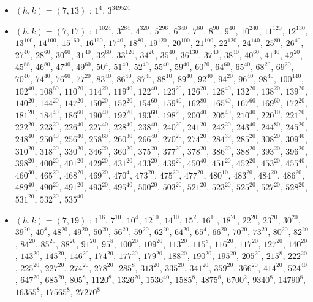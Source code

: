 \begin{itemize}
\item $(h,k)=(7,13)$ : $1^{4}$, $3^{349524}$
\item $(h,k)=(7,17)$ : $1^{1024}$, $3^{284}$, $4^{320}$, $5^{296}$, $6^{340}$, $7^{80}$, $8^{90}$, $9^{40}$, $10^{240}$, $11^{120}$, $12^{130}$, $13^{100}$, $14^{100}$, $15^{160}$, $16^{160}$, $17^{40}$, $18^{80}$, $19^{120}$, $20^{100}$, $21^{100}$, $22^{120}$, $24^{140}$, $25^{80}$, $26^{40}$, $27^{40}$, $28^{60}$, $30^{60}$, $31^{40}$, $32^{60}$, $33^{120}$, $34^{20}$, $35^{40}$, $36^{130}$, $37^{40}$, $38^{40}$, $40^{60}$, $41^{40}$, $42^{20}$, $45^{88}$, $46^{80}$, $47^{40}$, $49^{60}$, $50^{4}$, $51^{40}$, $52^{40}$, $55^{40}$, $59^{40}$, $60^{20}$, $64^{60}$, $65^{40}$, $68^{20}$, $69^{20}$, $70^{40}$, $74^{40}$, $76^{60}$, $77^{20}$, $83^{40}$, $86^{40}$, $87^{40}$, $88^{10}$, $89^{40}$, $92^{40}$, $94^{20}$, $96^{40}$, $98^{40}$, $100^{140}$, $102^{40}$, $108^{60}$, $110^{20}$, $114^{20}$, $119^{40}$, $122^{40}$, $123^{20}$, $126^{20}$, $128^{40}$, $132^{20}$, $138^{20}$, $139^{20}$, $140^{20}$, $144^{20}$, $147^{20}$, $150^{20}$, $152^{20}$, $154^{60}$, $159^{40}$, $162^{80}$, $165^{40}$, $167^{60}$, $169^{60}$, $172^{20}$, $181^{20}$, $184^{40}$, $186^{60}$, $190^{40}$, $192^{20}$, $193^{60}$, $198^{20}$, $200^{40}$, $205^{40}$, $210^{40}$, $220^{10}$, $221^{20}$, $222^{20}$, $223^{20}$, $226^{40}$, $227^{40}$, $228^{40}$, $238^{40}$, $240^{20}$, $241^{20}$, $242^{20}$, $243^{40}$, $244^{80}$, $245^{20}$, $248^{40}$, $250^{40}$, $256^{40}$, $258^{60}$, $260^{30}$, $266^{40}$, $270^{20}$, $274^{20}$, $284^{30}$, $285^{20}$, $308^{20}$, $309^{40}$, $310^{20}$, $318^{20}$, $330^{20}$, $346^{20}$, $360^{20}$, $375^{20}$, $377^{20}$, $378^{20}$, $386^{20}$, $388^{20}$, $393^{20}$, $396^{20}$, $398^{20}$, $400^{20}$, $401^{20}$, $429^{20}$, $431^{20}$, $433^{20}$, $439^{20}$, $450^{40}$, $451^{20}$, $452^{20}$, $453^{20}$, $455^{40}$, $460^{30}$, $465^{20}$, $468^{20}$, $469^{20}$, $470^{4}$, $473^{20}$, $475^{20}$, $477^{20}$, $480^{10}$, $483^{20}$, $484^{20}$, $486^{20}$, $489^{40}$, $490^{20}$, $491^{20}$, $493^{20}$, $495^{40}$, $500^{20}$, $503^{20}$, $521^{20}$, $523^{20}$, $525^{20}$, $527^{20}$, $528^{20}$, $531^{20}$, $532^{20}$, $535^{40}$
\item $(h,k)=(7,19)$ : $1^{16}$, $7^{10}$, $10^{4}$, $12^{10}$, $14^{10}$, $15^{2}$, $16^{10}$, $18^{20}$, $22^{20}$, $23^{20}$, $30^{20}$, $39^{20}$, $40^{8}$, $48^{20}$, $49^{20}$, $50^{20}$, $56^{20}$, $59^{20}$, $62^{20}$, $64^{20}$, $65^{4}$, $66^{20}$, $70^{20}$, $73^{20}$, $80^{20}$, $82^{20}$, $84^{20}$, $85^{20}$, $88^{20}$, $91^{20}$, $95^{8}$, $100^{20}$, $109^{20}$, $113^{20}$, $115^{8}$, $116^{20}$, $117^{20}$, $127^{20}$, $140^{20}$, $143^{20}$, $145^{20}$, $146^{20}$, $174^{20}$, $177^{20}$, $179^{20}$, $188^{20}$, $190^{20}$, $195^{20}$, $205^{20}$, $215^{8}$, $222^{20}$, $225^{20}$, $227^{20}$, $274^{20}$, $278^{20}$, $285^{8}$, $313^{20}$, $335^{20}$, $341^{20}$, $359^{20}$, $366^{20}$, $414^{20}$, $524^{40}$, $647^{20}$, $685^{20}$, $805^{8}$, $1120^{8}$, $1326^{20}$, $1536^{40}$, $1585^{8}$, $4875^{8}$, $6700^{2}$, $9340^{8}$, $14790^{8}$, $16355^{8}$, $17565^{8}$, $27270^{8}$

\end{itemize}
